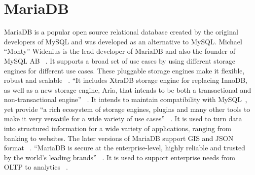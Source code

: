 \section{MariaDB}
 
MariaDB is a popular open source relational database created by the
original developers of MySQL and was developed as an alternative to
MySQL. Michael ``Monty'' Widenius is the lead developer of MariaDB and
also the founder of MySQL AB ~\cite{hid-sp18-516-wiki-MariaDB}. It supports a broad
set of use cases by using different storage engines for different use
cases. These pluggable storage engines make it flexible, robust and
scalable ~\cite{hid-sp18-516-mariadb-server}. ``It includes XtraDB storage engine for
replacing InnoDB, as well as a new storage engine, Aria, that intends
to be both a transactional and non-transactional engine''
~\cite{hid-sp18-516-wiki-MariaDB}. It intends to maintain compatibility with
MySQL~\cite{hid-sp18-516-wiki-MariaDB}, yet provide ``a rich ecosystem of storage
engines, plugins and many other tools to make it very versatile for a
wide variety of use cases'' ~\cite{hid-sp18-516-www-mariadb-org}. It is used to turn
data into structured information for a wide variety of applications,
ranging from banking to websites. The later versions of MariaDB
support GIS and JSON format ~\cite{hid-sp18-516-www-mariabdb-org}. ``MariaDB is
secure at the enterprise-level, highly reliable and trusted by the
world's leading brands'' ~\cite{hid-sp18-516-about-mariadb}. It is used to support
enterprise needs from OLTP to analytics ~\cite{hid-sp18-516-about-mariadb}.
 


